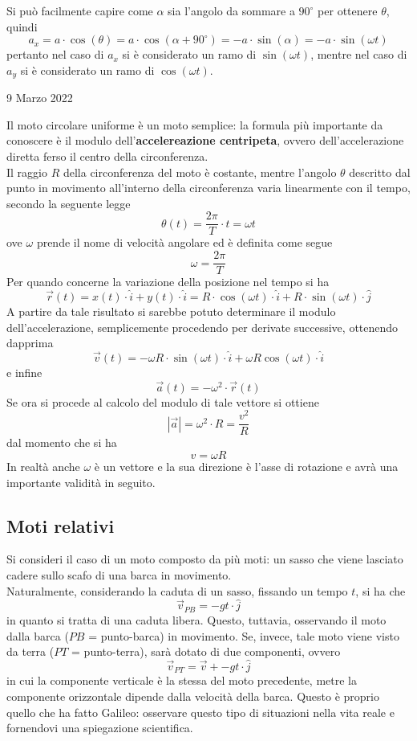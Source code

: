 \documentclass[a4paper]{extarticle}
\begin{document}
\vspace{1em}
\noindent
Si può facilmente capire come $\alpha$ sia l'angolo da sommare a $90^\circ$ per ottenere $\theta$, quindi
\[a_x=a \cdot \cos(\theta) = a \cdot \cos(\alpha + 90^\circ) = -a \cdot \sin(\alpha) = -a \cdot \sin(\omega t)\]
pertanto nel caso di $a_x$ si è considerato un ramo di $\sin(\omega t)$, mentre nel caso di $a_y$ si è considerato un ramo di $\cos(\omega t)$.

\newpage
\noindent
\begin{center}
  9 Marzo 2022
\end{center}
Il moto circolare uniforme è un moto semplice: la formula più importante da conoscere è il modulo dell'\textbf{accelereazione centripeta}, ovvero dell'accelerazione diretta ferso il centro della circonferenza.\\
Il raggio $R$ della circonferenza del moto è costante, mentre l'angolo $\theta$ descritto dal punto in movimento all'interno della circonferenza varia linearmente con il tempo, secondo la seguente legge
\[\boxed{\theta(t) = \frac{2\pi}{T} \cdot t = \omega t}\]
ove $\omega$ prende il nome di velocità angolare ed è definita come segue
\[\boxed{\omega = \frac{2\pi}{T}}\]
Per quando concerne la variazione della posizione nel tempo si ha
\[\boxed{\vec{r}(t) = x(t) \cdot \hat{i} + y(t) \cdot \hat{i} = R \cdot \cos(\omega t) \cdot \hat{i} + R \cdot \sin(\omega t) \cdot \hat{j}}\]
A partire da tale risultato si sarebbe potuto determinare il modulo dell'accelerazione, semplicemente procedendo per derivate successive, ottenendo dapprima
\[\boxed{\vec{v}(t) = - \omega R \cdot \sin(\omega t) \cdot \hat{i} + \omega R \cos(\omega t) \cdot \hat{i}}\]
e infine
\[\boxed{\vec{a}(t) = -\omega^2 \cdot \vec{r}(t)}\]
Se ora si procede al calcolo del modulo di tale vettore si ottiene
\[\boxed{\left \vert \vec{a} \right \vert = \omega^2 \cdot R = \frac{v^2}{R}}\]
dal momento che si ha
\[\boxed{v = \omega R}\]
In realtà anche $\omega$ è un vettore e la sua direzione è l'asse di rotazione e avrà una importante validità in seguito.

\vspace{1em}
\subsection{Moti relativi}
Si consideri il caso di un moto composto da più moti: un sasso che viene lasciato cadere sullo scafo di una barca in movimento.\\
Naturalmente, considerando la caduta di un sasso, fissando un tempo $t$, si ha che
\[\vec{v}_{PB} = -g t \cdot \hat{j}\]
in quanto si tratta di una caduta libera. Questo, tuttavia, osservando il moto dalla barca ($PB$ = punto-barca) in movimento. Se, invece, tale moto viene visto da terra ($PT$ = punto-terra), sarà dotato di due componenti, ovvero
\[\vec{v}_{PT} = \vec{v} + -g t \cdot \hat{j}\]
in cui la componente verticale è la stessa del moto precedente, metre la componente orizzontale dipende dalla velocità della barca. Questo è proprio quello che ha fatto Galileo: osservare questo tipo di situazioni nella vita reale e fornendovi una spiegazione scientifica.
\end{document}
